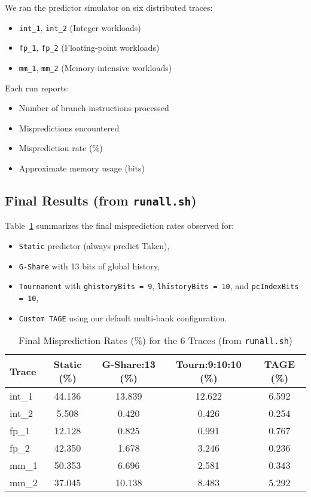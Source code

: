 \documentclass[11pt]{article}
\begin{document}
We ran the predictor simulator on six distributed traces:
\begin{itemize}
    \item \texttt{int\_1}, \texttt{int\_2} (Integer workloads)
    \item \texttt{fp\_1}, \texttt{fp\_2} (Floating-point workloads)
    \item \texttt{mm\_1}, \texttt{mm\_2} (Memory-intensive workloads)
\end{itemize}
Each run reports:
\begin{itemize}
    \item Number of branch instructions processed
    \item Mispredictions encountered
    \item Misprediction rate (\%)
    \item Approximate memory usage (bits)
\end{itemize}

\subsection{Final Results (from \texttt{runall.sh})}

Table~\ref{tab:final_results} summarizes the final misprediction rates observed for:
\begin{itemize}
    \item \texttt{Static} predictor (always predict Taken),
    \item \texttt{G-Share} with 13 bits of global history,
    \item \texttt{Tournament} with \texttt{ghistoryBits = 9}, \texttt{lhistoryBits = 10}, and \texttt{pcIndexBits = 10},
    \item \texttt{Custom TAGE} using our default multi-bank configuration.
\end{itemize}

\begin{table}[H]
\centering
\small
\begin{tabular}{@{}lcccc@{}}
\toprule
\textbf{Trace} & \textbf{Static (\%)} & \textbf{G-Share:13 (\%)} & \textbf{Tourn:9:10:10 (\%)} & \textbf{TAGE (\%)} \\
\midrule
int\_1 & 44.136 & 13.839 & 12.622 & 6.592 \\
int\_2 & 5.508  & 0.420  & 0.426  & 0.254 \\
fp\_1  & 12.128 & 0.825  & 0.991  & 0.767 \\
fp\_2  & 42.350 & 1.678  & 3.246  & 0.236 \\
mm\_1  & 50.353 & 6.696  & 2.581  & 0.343 \\
mm\_2  & 37.045 & 10.138 & 8.483  & 5.292 \\
\bottomrule
\end{tabular}
\caption{Final Misprediction Rates (\%) for the 6 Traces (from \texttt{runall.sh})}
\label{tab:final_results}
\end{table}
\end{document}
